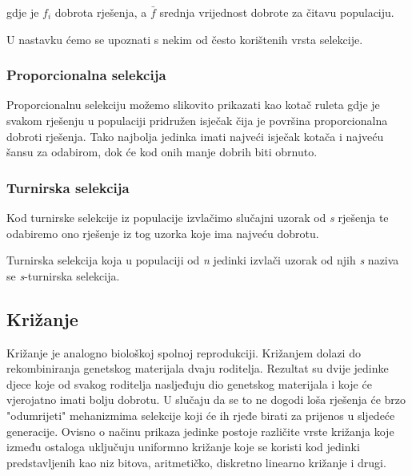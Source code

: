 \documentclass[times, utf8, zavrsni]{fer}
\begin{document}
gdje je $f_i$ dobrota rješenja, a $\bar{f}$ srednja vrijednost dobrote za čitavu populaciju. 

U nastavku ćemo se upoznati s nekim od često korištenih vrsta selekcije.

\subsubsection{Proporcionalna selekcija}

Proporcionalnu selekciju možemo slikovito prikazati kao kotač ruleta gdje je svakom rješenju u populaciji pridružen isječak čija je površina proporcionalna dobroti rješenja. Tako najbolja jedinka imati najveći isječak kotača i najveću šansu za odabirom, dok će kod onih manje dobrih biti obrnuto.

\subsubsection{Turnirska selekcija}

Kod turnirske selekcije iz populacije izvlačimo slučajni uzorak od \textit{s} rješenja te odabiremo ono rješenje iz tog uzorka koje ima najveću dobrotu. 

Turnirska selekcija koja u populaciji od \textit{n} jedinki izvlači uzorak od njih \textit{s} naziva se \textit{s}-turnirska selekcija.

\subsection{Križanje}
Križanje je analogno biološkoj spolnoj reprodukciji. Križanjem dolazi do rekombiniranja genetskog materijala dvaju roditelja. Rezultat su dvije jedinke djece koje od svakog roditelja nasljeđuju dio genetskog materijala i koje će vjerojatno imati bolju dobrotu. U slučaju da se to ne dogodi loša rješenja će brzo "odumrijeti" mehanizmima selekcije koji će ih rjeđe birati za prijenos u sljedeće generacije. Ovisno o načinu prikaza jedinke postoje različite vrste križanja koje između ostaloga uključuju uniformno križanje koje se koristi kod jedinki predstavljenih kao niz bitova, aritmetičko, diskretno linearno križanje i drugi.
\end{document}
